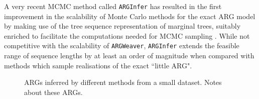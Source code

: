 \documentclass{article}
\begin{document}
A very recent MCMC method called \texttt{ARGInfer} has resulted in the first
improvement in the scalability of Monte Carlo methods for the exact ARG model 
by making use of the tree sequence representation of marginal trees, suitably enriched
to facilitate the computations needed for MCMC sampling \citep{mahmoudi2021inference}.
While not competitive with the scalability of \texttt{ARGWeaver}, \texttt{ARGInfer} extends
the feasible range of sequence lengths by at least an order of magnitude when
compared with methods which sample realisations of the exact ``little ARG".


\begin{figure}
\vspace{5em}
\caption{\label{fig-inferred-args}
ARGs inferred by different methods from a small dataset. Notes about these
ARGs.
}
\end{figure}



\end{document}
